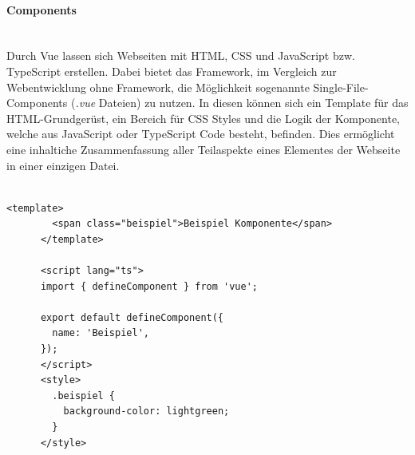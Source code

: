 \documentclass[10pt, a4paper]{article}
\begin{document}
\begin{onehalfspace}
  \paragraph*{Components} $~$ \\
  Durch Vue lassen sich Webseiten mit HTML, CSS und JavaScript bzw. TypeScript erstellen. Dabei bietet das Framework, im Vergleich zur Webentwicklung ohne Framework, die Möglichkeit sogenannte Single-File-Components (\textit{.vue} Dateien) zu nutzen. In diesen können sich ein Template für das HTML-Grundgerüst, ein Bereich für CSS Styles und die Logik der Komponente, welche aus JavaScript oder TypeScript Code besteht, befinden. Dies ermöglicht eine inhaltiche Zusammenfassung aller Teilaspekte eines Elementes der Webseite in einer einzigen Datei.
  \\~\\
  \begin{minipage}{\textwidth}
    \begin{lstlisting}[caption={Beispiel einer simplen \textit{vue component}-Datei}, captionpos=b, label=lst:EinfacheComponent]
      <template>
        <span class="beispiel">Beispiel Komponente</span>
      </template>

      <script lang="ts">
      import { defineComponent } from 'vue';

      export default defineComponent({
        name: 'Beispiel',
      });
      </script>
      <style>
        .beispiel {
          background-color: lightgreen;
        }
      </style>
    \end{lstlisting}
  \end{minipage}


\end{onehalfspace}
\end{document}
